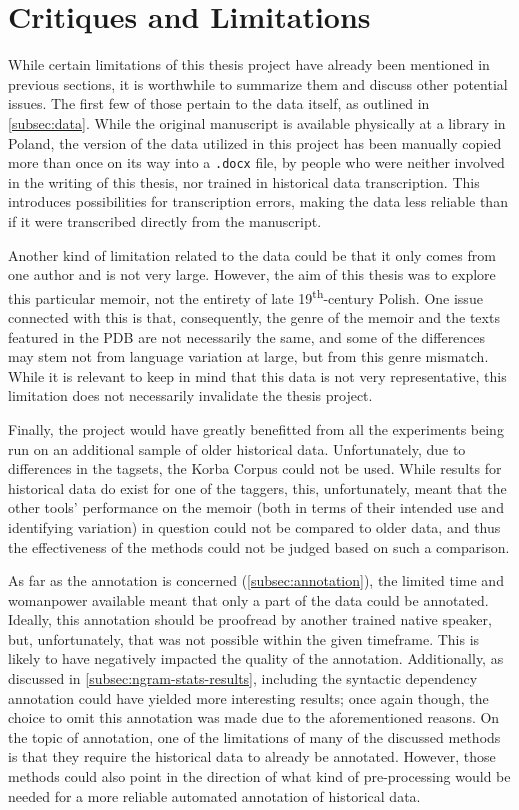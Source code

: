 \section{Critiques and Limitations}
\label{sec:critiques}

While certain limitations of this thesis project have already been mentioned in previous sections, it is worthwhile to summarize them and discuss other potential issues. The first few of those pertain to the data itself, as outlined in \autoref{subsec:data}. While the original manuscript is available physically at a library in Poland, the version of the data utilized in this project has been manually copied more than once on its way into a \texttt{.docx} file, by people who were neither involved in the writing of this thesis, nor trained in historical data transcription. This introduces possibilities for transcription errors, making the data less reliable than if it were transcribed directly from the manuscript. 

Another kind of limitation related to the data could be that it only comes from one author and is not very large. However, the aim of this thesis was to explore this particular memoir, not the entirety of late 19\textsuperscript{th}-century Polish. One issue connected with this is that, consequently, the genre of the memoir and the texts featured in the PDB are not necessarily the same, and some of the differences may stem not from language variation at large, but from this genre mismatch. While it is relevant to keep in mind that this data is not very representative, this limitation does not necessarily invalidate the thesis project.

Finally, the project would have greatly benefitted from all the experiments being run on an additional sample of older historical data. Unfortunately, due to differences in the tagsets, the Korba Corpus could not be used. While results for historical data do exist for one of the taggers, this, unfortunately, meant that the other tools' performance on the memoir (both in terms of their intended use and identifying variation) in question could not be compared to older data, and thus the effectiveness of the methods could not be judged based on such a comparison.

As far as the annotation is concerned (\autoref{subsec:annotation}), the limited time and womanpower available meant that only a part of the data could be annotated. Ideally, this annotation should be proofread by another trained native speaker, but, unfortunately, that was not possible within the given timeframe. This is likely to have negatively impacted the quality of the annotation. Additionally, as discussed in \autoref{subsec:ngram-stats-results}, including the syntactic dependency annotation could have yielded more interesting results; once again though, the choice to omit this annotation was made due to the aforementioned reasons. On the topic of annotation, one of the limitations of many of the discussed methods is that they require the historical data to already be annotated. However, those methods could also point in the direction of what kind of pre-processing would be needed for a more reliable automated annotation of historical data.


